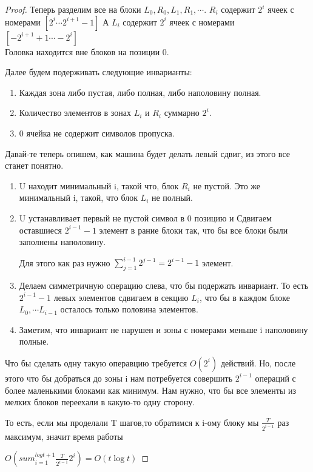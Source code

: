 \begin{proof}
	Теперь разделим все на блоки $L_0, R_0, L_1, R_1, \cdots$.
	$R_i$ содержит $2^i$ ячеек с номерами $[2^i \cdots 2^{i + 1} - 1]$
	А $L_i$ содержит $2^i$ ячеек с номерами $[-2^{i + 1} + 1 \cdots -2^i]$\\ 
	
	Головка находится вне блоков на позиции 0. 

	Далее будем подерживать следующие инварианты:
	\begin{enumerate}
	\item 
		Каждая зона либо пустая, либо полная, либо наполовину полная. 
	\item
		Количество элементов в зонах $L_i$ и $R_i$ суммарно $2^i$. 
	\item
		0 ячейка не содержит символов пропуска.  
        \end{enumerate}

        Давай-те теперь опишем, как машина будет делать левый сдвиг, из 
        этого все станет понятно. 

        \begin{enumerate}
        \item U находит минимальный i, такой что, блок $R_i$ не пустой. 
        Это же минимальный i, такой, что блок $L_i$ не полный. 
        \item U устанавливает первый не пустой символ в 0 позицию и 
        Сдвигаем оставшиеся $2^{i - 1} - 1$ элемент в рание блоки так, 
        что бы все блоки были заполнены наполовину. 

        Для этого как раз нужно $\sum_{j = 1}^{i - 1} 2^{j - 1} = 2^{i - 1} - 1$ элемент. 
        \item 
        Делаем симметричную операцию слева, что бы подержать инвариант. 
        То есть $2^{i - 1} - 1$ левых элементов сдвигаем в секцию $L_i$, 
        что бы в каждом блоке $L_0, \cdots L_{i - 1}$  осталось только половина 
        элементов. 
        \item
        Заметим, что инвариант не нарушен и зоны с номерами меньше i наполовину 
        полные.
        \end{enumerate}

        Что бы сделать одну такую операвцию требуется $O(2^i)$ действий. Но, 
        после этого что бы добраться до зоны i нам потребуется совершить $2^{i - 1}$ операций
        с более маленькими блоками как минимум. Нам нужно, что бы все элементы из 
        мелких блоков переехали в какую-то одну сторону. 

        То есть, если мы проделали T шагов,то обратимся к i-ому блоку мы $\frac{T}{2^{i - 1}}$ раз 
        максимум, значит время работы

        $O(sum_{i = 1}^{log t + 1}\frac{T}{2^{i - 1}}2^i) = O(t \log t)$
\end{proof}

